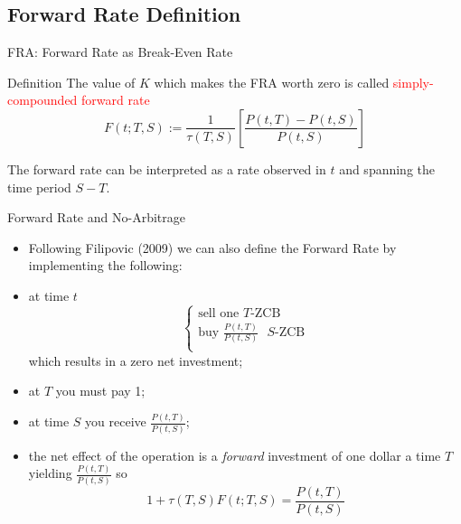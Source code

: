 \documentclass{beamer}
\begin{document}
\subsection{Forward Rate Definition}
\begin{frame}{FRA: Forward Rate as Break-Even Rate}
	\begin{block}{Definition}
		The value of $K$ which makes the FRA worth zero is called \textcolor{red}{simply-compounded forward rate}
		\begin{equation}
			F(t;T,S):=\frac{1}{\tau(T,S)}\left[\frac{P(t,T)-P(t,S)}{P(t,S)}\right]
			\label{eq:forward_rate_definition}
		\end{equation}
	\end{block}
	
	The forward rate can be interpreted as a rate observed in $t$ and spanning the time period $S-T$.
	
	
\end{frame}

\begin{frame}{Forward Rate and No-Arbitrage}
	\begin{itemize}
		\item Following Filipovic (2009) we can also define the Forward Rate by implementing the following:
		\item at time $t$
		\begin{equation*}
			\begin{cases}
			\text{sell one $T$-ZCB}\\
			\text{buy $\frac{P(t,T)}{P(t,S)}$ $S$-ZCB}\\
			\end{cases} 
		\end{equation*}
		which results in a zero net investment;
		\item at $T$ you must pay 1;
		\item at time $S$ you receive $\frac{P(t,T)}{P(t,S)}$;
		\item the net effect of the operation is a \emph{forward} investment of one dollar a time $T$ yielding $\frac{P(t,T)}{P(t,S)}$ so
		\begin{equation*}
		1 + \tau(T,S)F(t;T,S) = \frac{P(t,T)}{P(t,S)}
		\end{equation*}
	\myendproof
	\end{itemize}
\end{frame}
\end{document}
